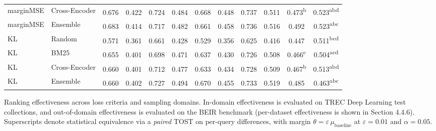 \begin{table}[t]
\begin{tabular}{llcccccccccc}
  marginMSE & Cross-Encoder & 0.676\textsuperscript{\phantom{aaa}} & 0.422\textsuperscript{\phantom{aaa}} & 0.724\textsuperscript{\phantom{aaa}} & 0.484\textsuperscript{\phantom{aaa}} & 0.668\textsuperscript{\phantom{aaa}} & 0.448\textsuperscript{\phantom{aaa}} & 0.737\textsuperscript{\phantom{aaa}} & 0.511\textsuperscript{\phantom{aaa}} & 0.473\textsuperscript{b\phantom{aa}} & 0.523\textsuperscript{abd\phantom{}} \\
  marginMSE & Ensemble & 0.683\textsuperscript{\phantom{aaa}} & 0.414\textsuperscript{\phantom{aaa}} & 0.717\textsuperscript{\phantom{aaa}} & 0.482\textsuperscript{\phantom{aaa}} & 0.661\textsuperscript{\phantom{aaa}} & 0.458\textsuperscript{\phantom{aaa}} & 0.736\textsuperscript{\phantom{aaa}} & 0.516\textsuperscript{\phantom{aaa}} & 0.492\textsuperscript{\phantom{aaa}} & 0.523\textsuperscript{abc\phantom{}} \\
  KL & Random & 0.571\textsuperscript{\phantom{aaa}} & 0.361\textsuperscript{\phantom{aaa}} & 0.661\textsuperscript{\phantom{aaa}} & 0.428\textsuperscript{\phantom{aaa}} & 0.529\textsuperscript{\phantom{aaa}} & 0.356\textsuperscript{\phantom{aaa}} & 0.625\textsuperscript{\phantom{aaa}} & 0.416\textsuperscript{\phantom{aaa}} & 0.447\textsuperscript{\phantom{aaa}} & 0.511\textsuperscript{bcd\phantom{}} \\
  KL & BM25 & 0.655\textsuperscript{\phantom{aaa}} & 0.401\textsuperscript{\phantom{aaa}} & 0.698\textsuperscript{\phantom{aaa}} & 0.471\textsuperscript{\phantom{aaa}} & 0.637\textsuperscript{\phantom{aaa}} & 0.430\textsuperscript{\phantom{aaa}} & 0.726\textsuperscript{\phantom{aaa}} & 0.508\textsuperscript{\phantom{aaa}} & 0.466\textsuperscript{c\phantom{aa}} & 0.504\textsuperscript{acd\phantom{}} \\
  KL & Cross-Encoder & 0.660\textsuperscript{\phantom{aaa}} & 0.401\textsuperscript{\phantom{aaa}} & 0.712\textsuperscript{\phantom{aaa}} & 0.477\textsuperscript{\phantom{aaa}} & 0.633\textsuperscript{\phantom{aaa}} & 0.434\textsuperscript{\phantom{aaa}} & 0.728\textsuperscript{\phantom{aaa}} & 0.509\textsuperscript{\phantom{aaa}} & 0.467\textsuperscript{b\phantom{aa}} & 0.513\textsuperscript{abd\phantom{}} \\
  KL & Ensemble & 0.660\textsuperscript{\phantom{aaa}} & 0.402\textsuperscript{\phantom{aaa}} & 0.727\textsuperscript{\phantom{aaa}} & 0.494\textsuperscript{\phantom{aaa}} & 0.670\textsuperscript{\phantom{aaa}} & 0.455\textsuperscript{\phantom{aaa}} & 0.733\textsuperscript{\phantom{aaa}} & 0.519\textsuperscript{\phantom{aaa}} & 0.485\textsuperscript{\phantom{aaa}} & 0.463\textsuperscript{abc\phantom{}} \\
  \bottomrule
  \end{tabular}
\end{table}
  \caption{Ranking effectiveness across loss criteria and sampling domains. In-domain effectiveness is evaluated on TREC Deep Learning test collections, and out-of-domain effectiveness is evaluated on the BEIR benchmark (per-dataset effectiveness is shown in Section 4.4.6). Superscripts denote statistical equivalence via a \emph{paired} TOST on per-query differences, with margin $\theta = \varepsilon\,\mu_{\text{baseline}}$ at $\varepsilon = 0.01$ and $\alpha = 0.05$.}
  \label{tab:ch4-main-results}
